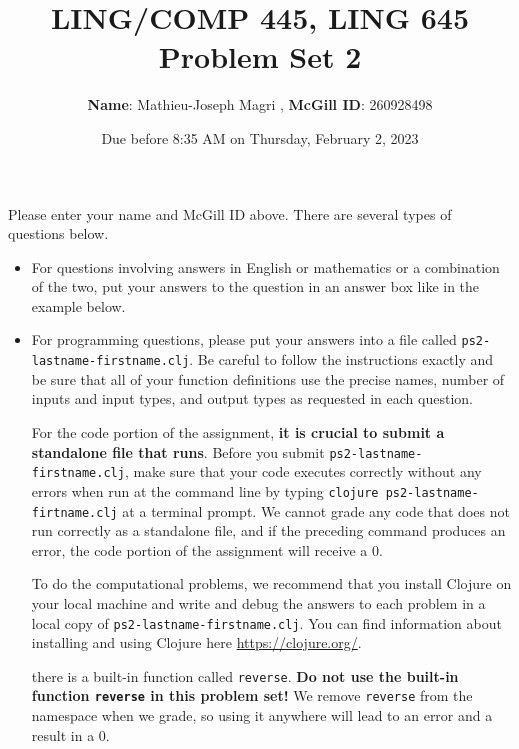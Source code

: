 \documentclass[10pt]{article}
\author{
  \textbf{Name}: Mathieu-Joseph Magri      %
, \textbf{McGill ID}: 260928498 %
}
\newcommand{\PSnum}{2}
\begin{document}
\title{LING/COMP 445, LING 645\\Problem Set \PSnum}
\date{Due before 8:35 AM on Thursday, February 2, 2023}
\maketitle

Please enter your name and McGill ID above. There are several types of questions
below.

\begin{itemize}
  \item For questions involving answers in English or mathematics or a
    combination of the two, put your answers to the question in an answer box
    like in the example below.
  \item For programming questions, please put your answers into a file called
    \texttt{ps\PSnum-lastname-firstname.clj}. Be careful to follow the
    instructions exactly and be sure that all of your function definitions use
    the precise names, number of inputs and input types, and output types as
    requested in each question.

    For the code portion of the assignment, \textbf{it is crucial to submit a
    standalone file that runs}. Before you submit
    \texttt{ps\PSnum-lastname-firstname.clj},  make sure that your code executes
    correctly without any errors  when run at the command line by typing
    \texttt{clojure ps\PSnum-lastname-firtname.clj} at a terminal prompt. We
    cannot grade any code that does not run correctly as a standalone file, and
    if the preceding command produces an error, the code portion of the
    assignment will receive a $0$.

    To do the computational problems, we recommend that you install Clojure on
    your local machine and write and debug the answers to each problem in a
    local copy of \texttt{ps\PSnum-lastname-firstname.clj}. You can find
    information about installing and using Clojure here
    \url{https://clojure.org/}.

    {\color{red}{Note} there is a built-in function called \texttt{reverse}.
      \textbf{Do not use the built-in function \texttt{reverse} in this problem
      set!} We remove \texttt{reverse} from the namespace when  we grade, so
    using it anywhere will lead to an error and a result in a $0$.}
\end{itemize}
\end{document}
